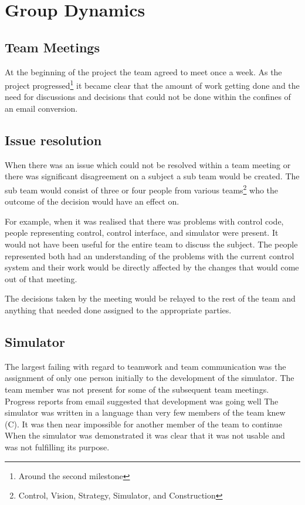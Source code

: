 \section{Group Dynamics}

\subsection{Team Meetings}

At the beginning of the project the team agreed to meet once a week. As the
project progressed\footnote{Around the second milestone} it became clear that
the amount of work getting done and the need for discussions and decisions that
could not be done within the confines of an email conversion.

\subsection{Issue resolution}

When there was an issue which could not be resolved within a team meeting or
there was significant disagreement on a subject a sub team would be created.
The sub team would consist of three or four people from various
teams\footnote{Control, Vision, Strategy, Simulator, and Construction} who the
outcome of the decision would have an effect on.

For example, when it was realised that there was problems with control code,
people representing control, control interface, and simulator were present. It
would not have been useful for the entire team to discuss the subject. The
people represented both had an understanding of the problems with the current
control system and their work would be directly affected by the changes that
would come out of that meeting.

The decisions taken by the meeting would be relayed to the rest of the team and
anything that needed done assigned to the appropriate parties.

\subsection{Simulator}

The largest failing with regard to teamwork and team communication was the
assignment of only one person initially to the development of the simulator.
The team member was not present for some of the subsequent team meetings.
Progress reports from email suggested that development was going well The
simulator was written in a language than very few members of the team knew (C).
It was then near impossible for another member of the team to continue When the
simulator was demonstrated it was clear that it was not usable and was not
fulfilling its purpose.

